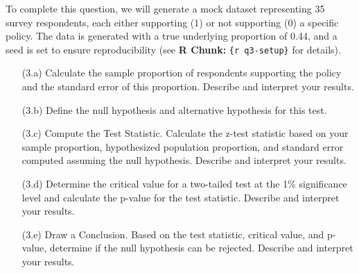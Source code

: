 \documentclass[11pt]{article}
\begin{document}
To complete this question, we will generate a mock dataset representing 35 survey respondents, each either supporting (1) or not supporting (0) a specific policy. The data is generated with a true underlying proportion of 0.44, and a seed is set to ensure reproducibility (see \textbf{R Chunk:} \texttt{\{r q3-setup\}} for details).

\begin{itemize}
    \item[(3.a)] Calculate the sample proportion of respondents supporting the policy and the standard error of this proportion.  Describe and interpret your results.

    \item[(3.b)] Define the null hypothesis and alternative hypothesis for this test.

    \item[(3.c)] Compute the Test Statistic. Calculate the z-test statistic based on your sample proportion, hypothesized population proportion, and standard error computed assuming the null hypothesis.  Describe and interpret your results.

    \item[(3.d)] Determine the critical value for a two-tailed test at the 1\% significance level and calculate the p-value for the test statistic.  Describe and interpret your results.

    \item[(3.e)] Draw a Conclusion. Based on the test statistic, critical value, and p-value, determine if the null hypothesis can be rejected.  Describe and interpret your results.

\end{itemize}
\end{document}
